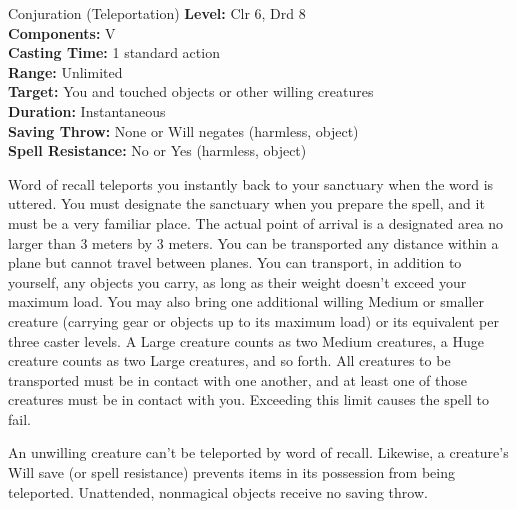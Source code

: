 {Conjuration (Teleportation)}
{
	\textbf{Level:}
	Clr 6, Drd 8\\
	\textbf{Components:}
	V\\
	\textbf{Casting Time:}
	1 standard action\\
	\textbf{Range:}
	Unlimited\\
	\textbf{Target:}
	You and touched objects or other willing creatures\\
	\textbf{Duration:}
	Instantaneous\\
	\textbf{Saving Throw:}
	None or Will negates (harmless, object)\\
	\textbf{Spell Resistance:}
	No or Yes (harmless, object)\\
}
{
	Word of recall teleports you instantly back to your sanctuary when the word is uttered. You must designate the sanctuary when you prepare the spell, and it must be a very familiar place. The actual point of arrival is a designated area no larger than 3 meters by 3 meters. You can be transported any distance within a plane but cannot travel between planes. You can transport, in addition to yourself, any objects you carry, as long as their weight doesn't exceed your maximum load. You may also bring one additional willing Medium or smaller creature (carrying gear or objects up to its maximum load) or its equivalent per three caster levels. A Large creature counts as two Medium creatures, a Huge creature counts as two Large creatures, and so forth. All creatures to be transported must be in contact with one another, and at least one of those creatures must be in contact with you. Exceeding this limit causes the spell to fail.

	An unwilling creature can't be teleported by word of recall. Likewise, a creature's Will save (or spell resistance) prevents items in its possession from being teleported. Unattended, nonmagical objects receive no saving throw.

}
